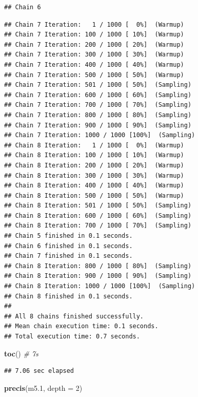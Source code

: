 \documentclass[
]{book}
\newenvironment{Shaded}{\begin{snugshade}}{\end{snugshade}}
\newcommand{\AttributeTok}[1]{\textcolor[rgb]{0.13,0.29,0.53}{#1}}
\newcommand{\CommentTok}[1]{\textcolor[rgb]{0.56,0.35,0.01}{\textit{#1}}}
\newcommand{\DecValTok}[1]{\textcolor[rgb]{0.00,0.00,0.81}{#1}}
\newcommand{\FloatTok}[1]{\textcolor[rgb]{0.00,0.00,0.81}{#1}}
\newcommand{\FunctionTok}[1]{\textcolor[rgb]{0.13,0.29,0.53}{\textbf{#1}}}
\newcommand{\NormalTok}[1]{#1}
\begin{document}
\begin{verbatim}
## Chain 6
\end{verbatim}

\begin{verbatim}
## Chain 7 Iteration:   1 / 1000 [  0%]  (Warmup) 
## Chain 7 Iteration: 100 / 1000 [ 10%]  (Warmup) 
## Chain 7 Iteration: 200 / 1000 [ 20%]  (Warmup) 
## Chain 7 Iteration: 300 / 1000 [ 30%]  (Warmup) 
## Chain 7 Iteration: 400 / 1000 [ 40%]  (Warmup) 
## Chain 7 Iteration: 500 / 1000 [ 50%]  (Warmup) 
## Chain 7 Iteration: 501 / 1000 [ 50%]  (Sampling) 
## Chain 7 Iteration: 600 / 1000 [ 60%]  (Sampling) 
## Chain 7 Iteration: 700 / 1000 [ 70%]  (Sampling) 
## Chain 7 Iteration: 800 / 1000 [ 80%]  (Sampling) 
## Chain 7 Iteration: 900 / 1000 [ 90%]  (Sampling) 
## Chain 7 Iteration: 1000 / 1000 [100%]  (Sampling) 
## Chain 8 Iteration:   1 / 1000 [  0%]  (Warmup) 
## Chain 8 Iteration: 100 / 1000 [ 10%]  (Warmup) 
## Chain 8 Iteration: 200 / 1000 [ 20%]  (Warmup) 
## Chain 8 Iteration: 300 / 1000 [ 30%]  (Warmup) 
## Chain 8 Iteration: 400 / 1000 [ 40%]  (Warmup) 
## Chain 8 Iteration: 500 / 1000 [ 50%]  (Warmup) 
## Chain 8 Iteration: 501 / 1000 [ 50%]  (Sampling) 
## Chain 8 Iteration: 600 / 1000 [ 60%]  (Sampling) 
## Chain 8 Iteration: 700 / 1000 [ 70%]  (Sampling) 
## Chain 5 finished in 0.1 seconds.
## Chain 6 finished in 0.1 seconds.
## Chain 7 finished in 0.1 seconds.
## Chain 8 Iteration: 800 / 1000 [ 80%]  (Sampling) 
## Chain 8 Iteration: 900 / 1000 [ 90%]  (Sampling) 
## Chain 8 Iteration: 1000 / 1000 [100%]  (Sampling) 
## Chain 8 finished in 0.1 seconds.
## 
## All 8 chains finished successfully.
## Mean chain execution time: 0.1 seconds.
## Total execution time: 0.7 seconds.
\end{verbatim}

\begin{Shaded}
\begin{Highlighting}[]
\FunctionTok{toc}\NormalTok{() }\CommentTok{\# 7s}
\end{Highlighting}
\end{Shaded}

\begin{verbatim}
## 7.06 sec elapsed
\end{verbatim}

\begin{Shaded}
\begin{Highlighting}[]
\FunctionTok{precis}\NormalTok{(m5}\FloatTok{.1}\NormalTok{, }\AttributeTok{depth =} \DecValTok{2}\NormalTok{)}
\end{Highlighting}
\end{Shaded}
\end{document}

